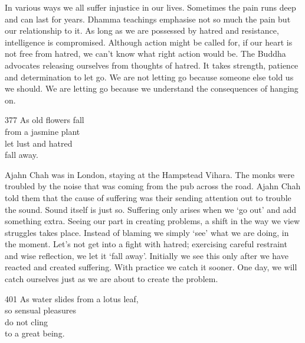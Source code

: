 \begin{dhpRefl}

In various ways we all suffer injustice in our lives. Sometimes the
pain runs deep and can last for years. Dhamma teachings emphasise not
so much the pain but our relationship to it. As long as we are
possessed by hatred and resistance, intelligence is compromised.
Although action might be called for, if our heart is not free from
hatred, we can't know what right action would be. The Buddha
advocates releasing ourselves from thoughts of hatred. It takes
strength, patience and determination to let go. We are not letting go
because someone else told us we should. We are letting go because we
understand the consequences of hanging on.

\end{dhpRefl}


\begin{dhpVerse}{377}
\label{dhp-377}
As old flowers fall\\
from a jasmine plant\\
let lust and hatred\\
fall away.
\end{dhpVerse}

\begin{dhpRefl}

Ajahn Chah was in London, staying at the Hampstead Vihara. The monks
were troubled by the noise that was coming from the pub across the
road. Ajahn Chah told them that the cause of suffering was their
sending attention out to trouble the sound. Sound itself is just so.
Suffering only arises when we `go out' and add something extra.
Seeing our part in creating problems, a shift in the way we view
struggles takes place. Instead of blaming we simply `see' what we are
doing, in the moment. Let's not get into a fight with hatred;
exercising careful restraint and wise reflection, we let it `fall
away'. Initially we see this only after we have reacted and created
suffering. With practice we catch it sooner. One day, we will catch
ourselves just as we are about to create the problem.

\end{dhpRefl}


\begin{dhpVerse}{401}
\label{dhp-401}
As water slides from a lotus leaf,\\
so sensual pleasures\\
do not cling\\
to a great being.
\end{dhpVerse}

